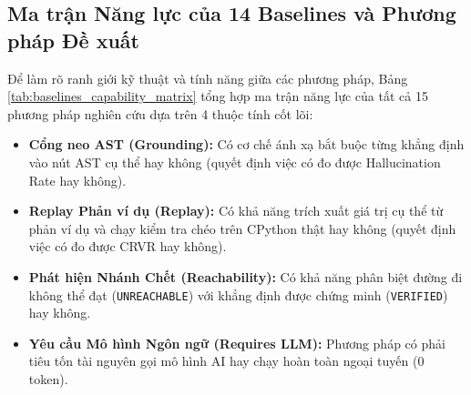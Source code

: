 \subsection{Ma trận Năng lực của 14 Baselines và Phương pháp Đề xuất}
Để làm rõ ranh giới kỹ thuật và tính năng giữa các phương pháp, Bảng \ref{tab:baselines_capability_matrix} tổng hợp ma trận năng lực của tất cả 15 phương pháp nghiên cứu dựa trên 4 thuộc tính cốt lõi:
\begin{itemize}
    \item \textbf{Cổng neo AST (Grounding):} Có cơ chế ánh xạ bắt buộc từng khẳng định vào nút AST cụ thể hay không (quyết định việc có đo được Hallucination Rate hay không).
    \item \textbf{Replay Phản ví dụ (Replay):} Có khả năng trích xuất giá trị cụ thể từ phản ví dụ và chạy kiểm tra chéo trên CPython thật hay không (quyết định việc có đo được CRVR hay không).
    \item \textbf{Phát hiện Nhánh Chết (Reachability):} Có khả năng phân biệt đường đi không thể đạt (\texttt{UNREACHABLE}) với khẳng định được chứng minh (\texttt{VERIFIED}) hay không.
    \item \textbf{Yêu cầu Mô hình Ngôn ngữ (Requires LLM):} Phương pháp có phải tiêu tốn tài nguyên gọi mô hình AI hay chạy hoàn toàn ngoại tuyến (0 token).
\end{itemize}


